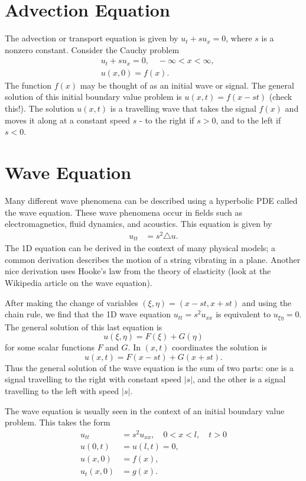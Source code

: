\label{lab:waveeqn}


\section*{Advection Equation}
The advection or transport equation is given by $u_t + s u_x = 0$, where $s$ is a nonzero constant.  
Consider the Cauchy problem 
\begin{align*}
	& u_t + su_x = 0, \quad -\infty < x < \infty,\\\
	& u(x,0) = f(x).
\end{align*}
The function $f(x)$ may be thought of as an initial wave or signal. The general solution of this initial boundary value problem is $u(x,t) = f(x-st)$ (check this!). The solution $u(x,t)$ is a travelling wave that takes the signal $f(x)$ and moves it along at a constant speed $s$ - to the right if $s > 0$, and to the left if $s < 0$. 

\section*{Wave Equation}
Many different wave phenomena can be described using a hyperbolic PDE called the wave equation. 
These wave phenomena occur in fields such as electromagnetics, fluid dynamics, and acoustics. 
This equation is given by 
\begin{align}
	u_{tt} &= s^2 \triangle u.
\end{align}
The 1D equation can be derived in the context of many physical models; a common derivation describes the motion of a string vibrating in a plane. Another nice derivation uses Hooke's law from the theory of elasticity (look at the Wikipedia article on the wave equation).  

After making the change of variables $(\xi,\eta) = (x-st, x + st)$ and using the chain rule, we find that the 1D wave equation $u_{tt} = s^2 u_{xx}$ is equivalent to $u_{\xi \eta} = 0$. The general solution of this last equation is 
\[ u(\xi, \eta) = F(\xi) + G(\eta) \]
for some scalar functions $F$ and $G$. In $(x,t)$ coordinates the solution is 
\[u(x,t) = F(x-st) + G(x+st).\]
Thus the general solution of the wave equation is the sum of two parts: one is a signal travelling to the right with constant speed $|s|$, and the other is a signal travelling to the left with speed $|s|$.

The wave equation is usually seen in the context of an initial boundary value problem. 
This takes the form 
\begin{align*}
	u_{tt} &= s^2 u_{xx}, \quad 0 < x < l, \quad t > 0\\
	u(0,t) &= u(l,t) = 0, \\
	u(x,0) &= f(x),\\ 
	u_t(x,0) &= g(x).
\end{align*}


